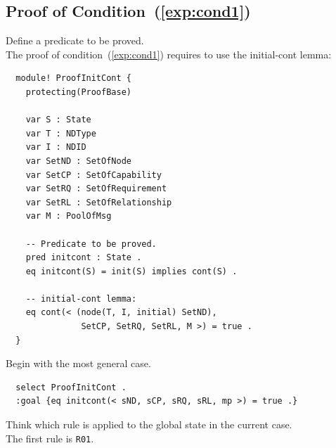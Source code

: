\documentclass[12pt]{report}
\begin{document}
\subsection{Proof of Condition~(\ref{exp:cond1})}
\label{sec:TOSCAinitcont}
 Define a predicate to be proved. \\
The proof of condition~(\ref{exp:cond1}) requires to use the
initial-cont lemma:
\small
\begin{verbatim}
  module! ProofInitCont {
    protecting(ProofBase)

    var S : State
    var T : NDType
    var I : NDID
    var SetND : SetOfNode
    var SetCP : SetOfCapability
    var SetRQ : SetOfRequirement
    var SetRL : SetOfRelationship
    var M : PoolOfMsg

    -- Predicate to be proved.
    pred initcont : State .
    eq initcont(S) = init(S) implies cont(S) .
  
    -- initial-cont lemma: 
    eq cont(< (node(T, I, initial) SetND), 
               SetCP, SetRQ, SetRL, M >) = true .
  }
\end{verbatim}
\normalsize

 Begin with the most general case.
\small
\begin{verbatim}
  select ProofInitCont .
  :goal {eq initcont(< sND, sCP, sRQ, sRL, mp >) = true .}
\end{verbatim}
\normalsize

 Think which rule is applied to the 
global state in the current case. \\
The first rule is {\tt R01}. \\
\end{document}
